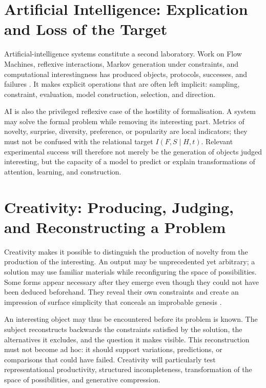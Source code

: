 \documentclass[11pt,a4paper]{article}
\begin{document}
\section{Artificial Intelligence: Explication and Loss of the Target}

Artificial-intelligence systems constitute a second laboratory. Work on Flow
Machines, reflexive interactions, Markov generation under constraints, and
computational interestingness has produced objects, protocols, successes, and
failures
\parencite{pachet2006clefs,pachet2008machines,pachet2012virtuosity,pachet2021assisted,pachet2026markov}.
It makes explicit operations that are often left implicit: sampling,
constraint, evaluation, model construction, selection, and direction.

AI is also the privileged reflexive case of the hostility of formalisation. A
system may solve the formal problem while removing its interesting part.
Metrics of novelty, surprise, diversity, preference, or popularity are local
indicators; they must not be confused with the relational target
\(I(F,S\mid H,t)\). Relevant experimental success will therefore not merely be
the generation of objects judged interesting, but the capacity of a model to
predict or explain transformations of attention, learning, and construction.

\section{Creativity: Producing, Judging, and Reconstructing a Problem}

Creativity makes it possible to distinguish the production of novelty from the
production of the interesting. An output may be unprecedented yet arbitrary; a
solution may use familiar materials while reconfiguring the space of
possibilities. Some forms appear necessary after they emerge even though they
could not have been deduced beforehand. They reveal their own constraints and
create an impression of surface simplicity that conceals an improbable genesis
\parencite{pachet2026impossibilite,pachet2027virtuosite}.

An interesting object may thus be encountered before its problem is known. The
subject reconstructs backwards the constraints satisfied by the solution, the
alternatives it excludes, and the question it makes visible. This reconstruction
must not become ad hoc: it should support variations, predictions, or
comparisons that could have failed. Creativity will particularly test
representational productivity, structured incompleteness, transformation of the
space of possibilities, and generative compression.
\end{document}
